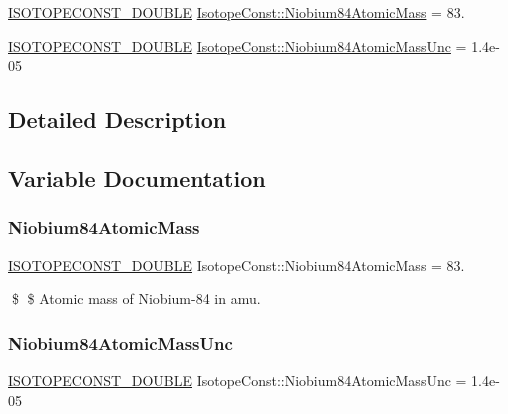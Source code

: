 \begin{DoxyCompactItemize}
\item 
\mbox{\hyperlink{group___isotope_const-_macros_ga8f45a7272ce02c0b4c65c44636ed719a}{I\+S\+O\+T\+O\+P\+E\+C\+O\+N\+S\+T\+\_\+\+D\+O\+U\+B\+LE}} \mbox{\hyperlink{group___isotope_const-_niobium-_nb84_ga9e2c2ed61a9f8561df90bafac359bdb9}{Isotope\+Const\+::\+Niobium84\+Atomic\+Mass}} = 83.
\item 
\mbox{\hyperlink{group___isotope_const-_macros_ga8f45a7272ce02c0b4c65c44636ed719a}{I\+S\+O\+T\+O\+P\+E\+C\+O\+N\+S\+T\+\_\+\+D\+O\+U\+B\+LE}} \mbox{\hyperlink{group___isotope_const-_niobium-_nb84_ga3f0e8065cc8a965cd04924426ab3bd36}{Isotope\+Const\+::\+Niobium84\+Atomic\+Mass\+Unc}} = 1.\+4e-\/05
\end{DoxyCompactItemize}


\subsection{Detailed Description}


\subsection{Variable Documentation}
\mbox{\label{group___isotope_const-_niobium-_nb84_ga9e2c2ed61a9f8561df90bafac359bdb9}} 
\subsubsection{\texorpdfstring{Niobium84\+Atomic\+Mass}{Niobium84AtomicMass}}
{\footnotesize\ttfamily \mbox{\hyperlink{group___isotope_const-_macros_ga8f45a7272ce02c0b4c65c44636ed719a}{I\+S\+O\+T\+O\+P\+E\+C\+O\+N\+S\+T\+\_\+\+D\+O\+U\+B\+LE}} Isotope\+Const\+::\+Niobium84\+Atomic\+Mass = 83.}

\$ \$ Atomic mass of Niobium-\/84 in amu. \mbox{\label{group___isotope_const-_niobium-_nb84_ga3f0e8065cc8a965cd04924426ab3bd36}} 
\subsubsection{\texorpdfstring{Niobium84\+Atomic\+Mass\+Unc}{Niobium84AtomicMassUnc}}
{\footnotesize\ttfamily \mbox{\hyperlink{group___isotope_const-_macros_ga8f45a7272ce02c0b4c65c44636ed719a}{I\+S\+O\+T\+O\+P\+E\+C\+O\+N\+S\+T\+\_\+\+D\+O\+U\+B\+LE}} Isotope\+Const\+::\+Niobium84\+Atomic\+Mass\+Unc = 1.\+4e-\/05}


